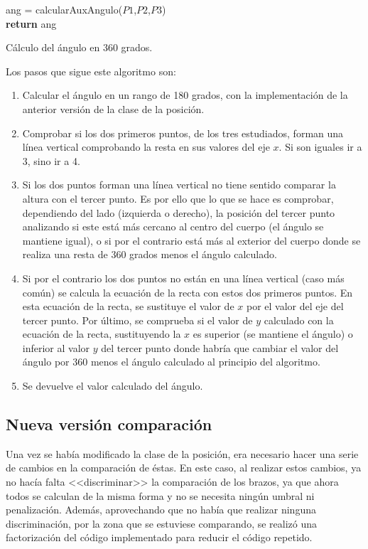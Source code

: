 {\begin{algorithm}[H]
	\SetAlgoLined
	ang = calcularAuxAngulo($P1$,$P2$,$P3$)\\
	\textbf{return} ang
	\caption{Cálculo del ángulo en 360 grados.}
\end{algorithm}


Los pasos que sigue este algoritmo son:
\begin{enumerate}
	\item Calcular el ángulo en un rango de 180 grados, con la implementación de la anterior versión de la clase de la posición.
	\item Comprobar si los dos primeros puntos, de los tres estudiados, forman una línea vertical comprobando la resta en sus valores del eje $x$. Si son iguales ir a 3, sino ir a 4.
	\item Si los dos puntos forman una línea vertical no tiene sentido comparar la altura con el tercer punto. Es por ello que lo que se hace es comprobar, dependiendo del lado (izquierda o derecho), la posición del tercer punto analizando si este está más cercano al centro del cuerpo (el ángulo se mantiene igual), o si por el contrario está más al exterior del cuerpo donde se realiza una resta de 360 grados menos el ángulo calculado.
	\item Si por el contrario los dos puntos no están en una línea vertical (caso más común) se calcula la ecuación de la recta con estos dos primeros puntos. En esta ecuación de la recta, se sustituye el valor de $x$ por el valor del eje del tercer punto. Por último, se comprueba si el valor de $y$ calculado con la ecuación de la recta, sustituyendo la $x$ es superior (se mantiene el ángulo) o inferior al valor $y$ del tercer punto donde habría que cambiar el valor del ángulo por 360 menos el ángulo calculado al principio del algoritmo.
	\item Se devuelve el valor calculado del ángulo.
\end{enumerate}

\subsection{Nueva versión comparación}
Una vez se había modificado la clase de la posición, era necesario hacer una serie de cambios en la comparación de éstas. En este caso, al realizar estos cambios, ya no hacía falta <<discriminar>> la comparación de los brazos, ya que ahora todos se calculan de la misma forma y no se necesita ningún umbral ni penalización. Además, aprovechando que no había que realizar ninguna discriminación, por la zona que se estuviese comparando, se realizó una factorización del código implementado para reducir el código repetido.

}
